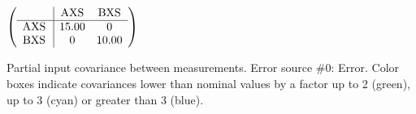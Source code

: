 \begin{table}[H]
\scriptsize
\begin{center}
\renewcommand{\arraystretch}{1.1}
\begin{math}\left(\begin{array}{c|cc}
 & \mathrm{AXS} & 
\mathrm{BXS} \\
\hline
\mathrm{AXS} \hspace*{2pt} &      15.00 &  0 \\
\mathrm{BXS} \hspace*{2pt} &  0 &      10.00 \\
\end{array}\right)\end{math}
\caption{Partial input covariance between measurements. Error source \#0: Error. Color boxes indicate covariances lower than nominal values by a factor up to 2 (green), up to 3 (cyan) or greater than 3 (blue).}
\renewcommand{\arraystretch}{1}
\end{center}
\end{table}
\clearpage
